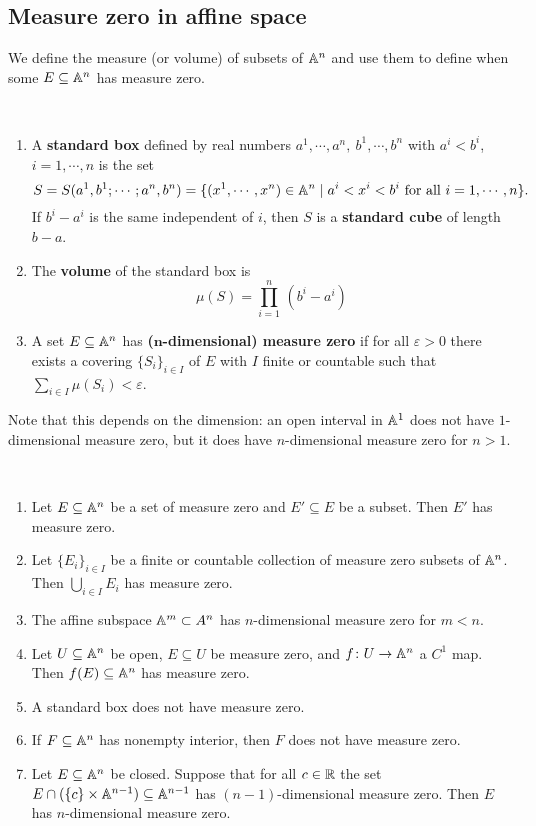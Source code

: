 \subsection{Measure zero in affine space}
We define the measure (or volume) of subsets of $\mathbb{A}^n $ and use them to define when some $E \subseteq \mathbb{A}^n $ has measure zero.
\begin{definition}[]
    \,
    \begin{enumerate}[label=(\roman*)]
        \item A \textbf{standard box} defined by real numbers $a^1,\cdots ,a^n , \ b^1,\cdots ,b^n $ with $a^i <b^i $, $i=1,\cdots ,n$ is the set \[
                S=S(a^1,b^1;\cdots ;a^n ,b^n )=\{(x^1,\cdots ,x^n )\in \mathbb{A}^n  \mid a^i <x^i <b^i \ \text{for all} \ i=1,\cdots ,n\} .
        \] If $b^i -a^i $ is the same independent of $i $, then $S$ is a \textbf{standard cube} of length $b-a$.
    \item The \textbf{volume} of the standard box  is \[
            \mu(S)=\prod _{i=1}^n \,(b^i -a^i )
    \] 
\item A set $E\subseteq \mathbb{A}^n $ has \textbf{($\mathbf n$-dimensional) measure zero} if for all $\varepsilon >0$ there exists a covering $\{S_i \} _{i \in I}$ of $E$ with $I$ finite or countable such that $\sum _{i\in I}\mu(S_i )<\varepsilon $.
    \end{enumerate}
    Note that this depends on the dimension: an open interval in $\mathbb{A}^1$ does not have $1$-dimensional measure zero, but it does have $n$-dimensional measure zero for $n>1$.
\end{definition}
\begin{prop}\label{big}
    \,
    \begin{enumerate}[label=(\arabic*)]
        \setlength\itemsep{-.2em}
        \item Let $E \subseteq \mathbb{A}^n $ be a set of measure zero and $E'  \subseteq E$ be a subset. Then $E'$ has measure zero.
        \item Let $\{E_i \} _{i \in I}$ be a finite or countable collection of measure zero subsets of $\mathbb{A}^n $. Then $\bigcup_{i \in I} E_i $ has measure zero.
        \item The affine subspace $\mathbb{A}^m \subset A^n $ has $n$-dimensional measure zero for $m<n$.
        \item Let $U \subseteq \mathbb{A}^n $ be open, $E \subseteq U$ be measure zero, and $f \colon U \to \mathbb{A}^n $ a $C^1$ map. Then $f(E) \subseteq \mathbb{A}^n $ has measure zero.
        \item A standard box does not have measure zero.
        \item If $F \subseteq \mathbb{A}^n $ has nonempty interior, then $F$ does not have measure zero. 
        \item Let $E \subseteq \mathbb{A}^n $ be closed. Suppose that for all $c \in \mathbb{R}$ the set $E \cap (\{c\} \times \mathbb{A}^{n-1})\subseteq \mathbb{A}^{n-1}$ has $(n-1)$-dimensional measure zero. Then $E$ has $n$-dimensional measure zero.
    \end{enumerate}
\end{prop}
